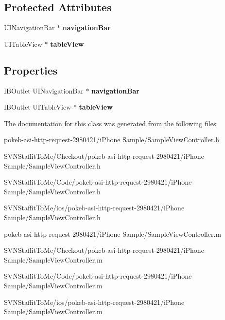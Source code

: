 \subsection*{\-Protected \-Attributes}
\begin{DoxyCompactItemize}
\item 
\hypertarget{interface_sample_view_controller_a60c813bdd019876a0319b6985e86be32}{
\-U\-I\-Navigation\-Bar $\ast$ {\bfseries navigation\-Bar}}
\label{interface_sample_view_controller_a60c813bdd019876a0319b6985e86be32}

\item 
\hypertarget{interface_sample_view_controller_a1963a6e9f4fea8b7e0ad280f206b9148}{
\-U\-I\-Table\-View $\ast$ {\bfseries table\-View}}
\label{interface_sample_view_controller_a1963a6e9f4fea8b7e0ad280f206b9148}

\end{DoxyCompactItemize}
\subsection*{\-Properties}
\begin{DoxyCompactItemize}
\item 
\hypertarget{interface_sample_view_controller_aba2e030189ceae78de5d3794a7f3383a}{
\-I\-B\-Outlet \-U\-I\-Navigation\-Bar $\ast$ {\bfseries navigation\-Bar}}
\label{interface_sample_view_controller_aba2e030189ceae78de5d3794a7f3383a}

\item 
\hypertarget{interface_sample_view_controller_a76d403481bc3b79a0d1910036b138de7}{
\-I\-B\-Outlet \-U\-I\-Table\-View $\ast$ {\bfseries table\-View}}
\label{interface_sample_view_controller_a76d403481bc3b79a0d1910036b138de7}

\end{DoxyCompactItemize}


\-The documentation for this class was generated from the following files\-:\begin{DoxyCompactItemize}
\item 
pokeb-\/asi-\/http-\/request-\/2980421/i\-Phone Sample/\-Sample\-View\-Controller.\-h\item 
\-S\-V\-N\-Staffit\-To\-Me/\-Checkout/pokeb-\/asi-\/http-\/request-\/2980421/i\-Phone Sample/\-Sample\-View\-Controller.\-h\item 
\-S\-V\-N\-Staffit\-To\-Me/\-Code/pokeb-\/asi-\/http-\/request-\/2980421/i\-Phone Sample/\-Sample\-View\-Controller.\-h\item 
\-S\-V\-N\-Staffit\-To\-Me/ios/pokeb-\/asi-\/http-\/request-\/2980421/i\-Phone Sample/\-Sample\-View\-Controller.\-h\item 
pokeb-\/asi-\/http-\/request-\/2980421/i\-Phone Sample/\-Sample\-View\-Controller.\-m\item 
\-S\-V\-N\-Staffit\-To\-Me/\-Checkout/pokeb-\/asi-\/http-\/request-\/2980421/i\-Phone Sample/\-Sample\-View\-Controller.\-m\item 
\-S\-V\-N\-Staffit\-To\-Me/\-Code/pokeb-\/asi-\/http-\/request-\/2980421/i\-Phone Sample/\-Sample\-View\-Controller.\-m\item 
\-S\-V\-N\-Staffit\-To\-Me/ios/pokeb-\/asi-\/http-\/request-\/2980421/i\-Phone Sample/\-Sample\-View\-Controller.\-m\end{DoxyCompactItemize}
